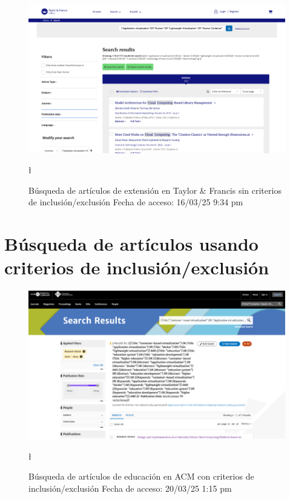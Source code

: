 \FloatBarrier\begin{figure}[H]
    \centering
    \includegraphics[width=\textwidth,keepaspectratio]{apendices/BD/sin-criterios/TF-ind.png}
    \caption{Búsqueda de artículos de extensión en Taylor \& Francis sin criterios de inclusión/exclusión
    Fecha de acceso: 16/03/25 9:34 pm
    }\l
\end{figure}
\FloatBarrier\section{Búsqueda de artículos usando criterios de inclusión/exclusión}\label{sec:busqueda-con-criterios}
\begin{figure}[H]
    \centering
    \includegraphics[width=\textwidth,keepaspectratio]{apendices/BD/criterios/ACM-ed.png}
    \caption{Búsqueda de artículos de educación en ACM con criterios de inclusión/exclusión
    Fecha de acceso: 20/03/25 1:15 pm
    }\l
\end{figure}
